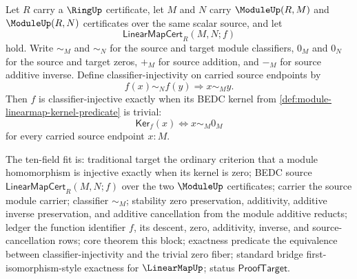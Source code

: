 \begin{theorem}
\label{thm:module-linearmap-trivial-kernel-classifier-injectivity}
Let $R$ carry a $\RingUp$ certificate, let $M$ and $N$ carry $\ModuleUp(R,M)$ and $\ModuleUp(R,N)$ certificates over the same scalar source, and let
$$
\mathsf{LinearMapCert}_R(M,N;f)
$$
hold. Write $\sim_M$ and $\sim_N$ for the source and target module classifiers, $0_M$ and $0_N$ for the source and target zeros, $+_M$ for source addition, and $-_M$ for source additive inverse. Define classifier-injectivity on carried source endpoints by
$$
f(x)\sim_N f(y)\Longrightarrow x\sim_M y.
$$
Then $f$ is classifier-injective exactly when its BEDC kernel from \autoref{def:module-linearmap-kernel-predicate} is trivial:
$$
\mathsf{Ker}_f(x)\Longleftrightarrow x\sim_M0_M
$$
for every carried source endpoint $x:M$.

The ten-field fit is: traditional target the ordinary criterion that a module homomorphism is injective exactly when its kernel is zero; BEDC source $\mathsf{LinearMapCert}_R(M,N;f)$ over the two $\ModuleUp$ certificates; carrier the source module carrier; classifier $\sim_M$; stability zero preservation, additivity, additive inverse preservation, and additive cancellation from the module additive reducts; ledger the function identifier $f$, its descent, zero, additivity, inverse, and source-cancellation rows; core theorem this block; exactness predicate the equivalence between classifier-injectivity and the trivial zero fiber; standard bridge first-isomorphism-style exactness for $\LinearMapUp$; status $\mathsf{ProofTarget}$.
\end{theorem}
